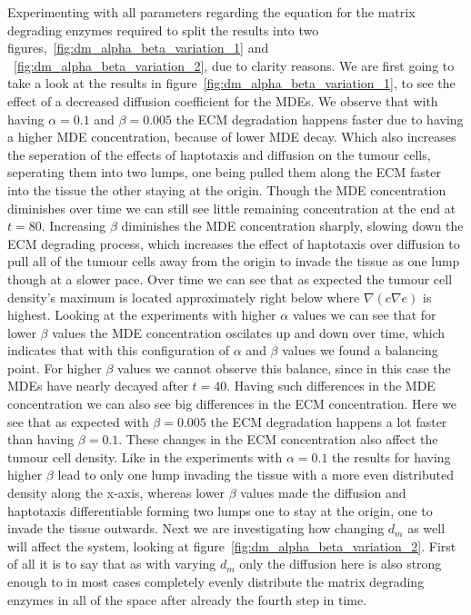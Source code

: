 Experimenting with all parameters regarding the equation for the matrix degrading enzymes required to split the results into two figures,~\ref{fig:dm_alpha_beta_variation_1} and ~\ref{fig:dm_alpha_beta_variation_2}, due to clarity reasons. 
We are first going to take a look at the results in figure~\ref{fig:dm_alpha_beta_variation_1}, to see the effect of a decreased diffusion coefficient for the MDEs. We observe that with having $\alpha =0.1$ and $\beta=0.005$ the ECM degradation happens faster due to having a higher MDE concentration, because of lower MDE decay. Which also increases the seperation of the effects of haptotaxis and diffusion on the tumour cells, seperating them into two lumps, one being pulled them along the ECM faster into the tissue the other staying at the origin. Though the MDE concentration diminishes over time we can still see little remaining concentration at the end at $t=80$. Increasing $\beta$ diminishes the MDE concentration sharply, slowing down the ECM degrading process, which increases the effect of haptotaxis over diffusion to pull all of the tumour cells away from the origin to invade the tissue as one lump though at a slower pace. Over time we can see that as expected the tumour cell density's maximum is located approximately right below where $\nabla (c \nabla e)$ is highest. \newline
Looking at the experiments with higher $\alpha$ values we can see that for lower $\beta$ values the MDE concentration oscilates up and down over time, which indicates that with this configuration of $\alpha$ and $\beta$ values we found a balancing point. For higher $\beta$ values we cannot observe this balance, since in this case the MDEs have nearly decayed after $t=40$. Having such differences in the MDE concentration we can also see big differences in the ECM concentration. Here we see that as expected with $\beta=0.005$ the ECM degradation happens a lot faster than having $\beta=0.1$. These changes in the ECM concentration also affect the tumour cell density. Like in the experiments with $\alpha=0.1$ the results for having higher $\beta$ lead to only one lump invading the tissue with a more even distributed density along the x-axis, whereas lower $\beta$ values made the diffusion and haptotaxis differentiable forming two lumps one to stay at the origin, one to invade the tissue outwards.\newline 
Next we are investigating how changing $d_m$ as well will affect the system, looking at figure~\ref{fig:dm_alpha_beta_variation_2}. First of all it is to say that as with varying $d_m$ only the diffusion here is also strong enough to in most cases completely evenly distribute the matrix degrading enzymes in all of the space after already the fourth step in time. \newline 
